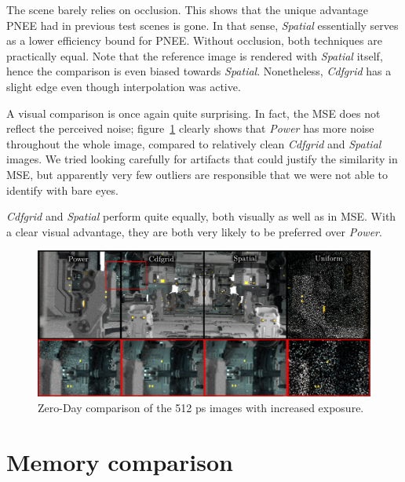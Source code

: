 The scene barely relies on occlusion. This shows that the unique advantage PNEE had in previous test scenes is gone. In that sense, \textit{Spatial} essentially serves as a lower efficiency bound for PNEE. Without occlusion, both techniques are practically equal. Note that the reference image is rendered with \textit{Spatial} itself, hence the comparison is even biased towards \textit{Spatial}. Nonetheless, \textit{Cdfgrid} has a slight edge even though interpolation was active. 

A visual comparison is once again quite surprising. In fact, the MSE does not reflect the perceived noise; figure~\ref{fig:zdcomp} clearly shows that \textit{Power} has more noise throughout the whole image, compared to relatively clean \textit{Cdfgrid} and \textit{Spatial} images. We tried looking carefully for artifacts that could justify the similarity in MSE, but apparently very few outliers are responsible that we were not able to identify with bare eyes.

\textit{Cdfgrid} and \textit{Spatial} perform quite equally, both visually as well as in MSE. With a clear visual advantage, they are both very likely to be preferred over \textit{Power}.

\begin{figure}
    \centering
    \includegraphics[width=1\textwidth]{figures/comparisons/ZDcomp_slim.pdf}
    \caption{Zero-Day comparison of the 512 ps images with increased exposure. }
    \label{fig:zdcomp}
\end{figure}


\FloatBarrier
\section{Memory comparison}

